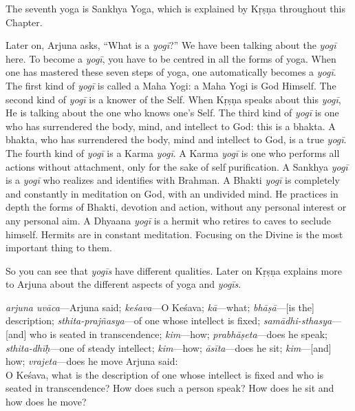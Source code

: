 The seventh yoga is Sankhya Yoga, which is explained by Kṛṣṇa throughout this Chapter.

Later on, Arjuna asks, “What is a \textit{yogī}?” We have been talking about the \textit{yogī} here. To become a \textit{yogī}, you have to be centred in all the forms of yoga. When one has mastered these seven steps of yoga, one automatically becomes a \textit{yogī}. The first kind of \textit{yogī} is called a Maha Yogi: a Maha Yogi is God Himself. The second kind of \textit{yogī} is a knower of the Self. When Kṛṣṇa speaks about this \textit{yogī}, He is talking about the one who knows one’s Self. The third kind of \textit{yogī} is one who has surrendered the body, mind, and intellect to God: this is a bhakta. A bhakta, who has surrendered the body, mind and intellect to God, is a true \textit{yogī}. The fourth kind of \textit{yogī} is a Karma \textit{yogī}. A Karma \textit{yogī} is one who performs all actions without attachment, only for the sake of selfpurification. A Sankhya \textit{yogī} is a \textit{yogī} who realizes and identifies with Brahman. A Bhakti \textit{yogī} is completely and constantly in meditation on God, with an undivided mind. He practices in depth the forms of Bhakti, devotion and action, without any personal interest or any personal aim. A Dhyaana \textit{yogī} is a hermit who retires to caves to seclude himself. Hermits are in constant meditation. Focusing on the Divine is the most important thing to them.

So you can see that \textit{yogīs} have different qualities. Later on Kṛṣṇa explains more to Arjuna about the different aspects of yoga and \textit{yogīs}.

{%
  \textit{arjuna uvāca}---Arjuna said; 
  \textit{keśava}---O Keśava; 
  \textit{kā}---what; 
  \textit{bhāṣā}---[is the] description; 
  \textit{sthita-prajñasya}---of one whose intellect is fixed; 
  \textit{samādhi-sthasya}---[and] who is seated in transcendence; 
  \textit{kim}---how; 
  \textit{prabhāṣeta}---does he speak; 
  \textit{sthita-dhīḥ}---one of steady intellect; 
  \textit{kim}---how; 
  \textit{āsīta}---does he sit; 
  \textit{kim}---[and] how; 
  \textit{vrajeta}---does he move
}
{%
  \hspace*{1em}Arjuna said: \\
  O Keśava, what is the description of one whose intellect is fixed and who is seated in transcendence? How does such a person speak? How does he sit and how does he move?
}


